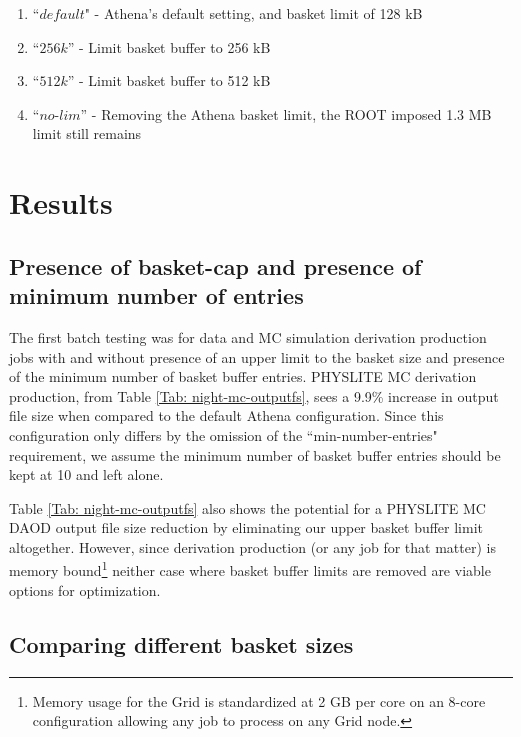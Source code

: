 \begin{enumerate}
    \item ``$\textit{default}$" - Athena's default setting, and basket limit of 128 kB
    \item ``$\textit{256k}$'' - Limit basket buffer to 256 kB
    \item ``$\textit{512k}$'' - Limit basket buffer to 512 kB
    \item ``$\textit{no-lim}$'' - Removing the Athena basket limit, the ROOT imposed 1.3 MB limit still remains
\end{enumerate}


\section{Results}
\label{sec:DAODProd_Results}

\subsection{Presence of basket-cap and presence of minimum number of entries}
\label{sec:DAODProd_Results_presence}

The first batch testing was for data and MC simulation derivation production jobs with and without presence of an upper limit to the basket size and presence of the minimum number of basket buffer entries. 
PHYSLITE MC derivation production, from Table \ref{Tab: night-mc-outputfs}, sees a 9.9\% increase in output file size when compared to the default Athena configuration. 
Since this configuration only differs by the omission of the ``min-number-entries" requirement, we assume the minimum number of basket buffer entries should be kept at 10 and left alone. 


Table \ref{Tab: night-mc-outputfs} also shows the potential for a PHYSLITE MC DAOD output file size reduction by eliminating our upper basket buffer limit altogether.  
However, since derivation production (or any job for that matter) is memory bound\footnote{Memory usage for the Grid is standardized at 2 GB per core on an 8-core configuration allowing any job to process on any Grid node.} neither case where basket buffer limits are removed are viable options for optimization. 

\subsection{Comparing different basket sizes}
\label{sec:DAODProd_Results_comparing}

